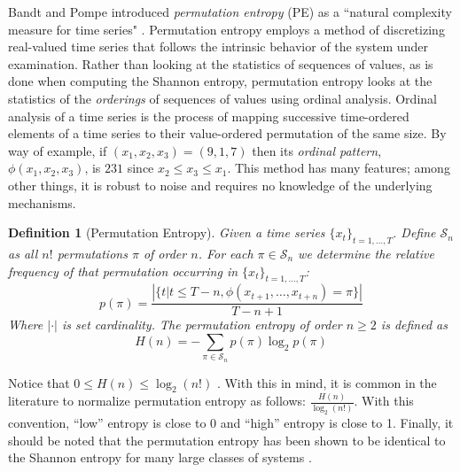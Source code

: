 \documentclass{article}
\newtheorem*{mydef}{Definition}
\begin{document}
Bandt and Pompe introduced \emph{permutation entropy} (PE)
as a ``natural complexity measure for time series"
\cite{bandt2002per}.  Permutation entropy employs a method of
discretizing real-valued time series that follows the intrinsic
behavior of the system under examination.  Rather than looking at the
statistics of sequences of values, as is done when computing the
Shannon entropy, permutation entropy looks at the statistics of the
\emph{orderings} of sequences of values using ordinal analysis.
Ordinal analysis of a time series is the process of mapping successive
time-ordered elements of a time series to their value-ordered
permutation of the same size.  By way of example, if $(x_1, x_2, x_3)
= (9, 1, 7)$ then its \emph{ordinal pattern}, $\phi(x_1, x_2, x_3)$,
is $231$ since $x_2 \leq x_3 \leq x_1$.  This method has many
features; among other things, it is robust to noise and requires no
knowledge of the underlying mechanisms.








\begin{mydef}[Permutation Entropy]
  Given a time series $\{x_t\}_{t = 1,\dots,T}$. Define
  $\mathcal{S}_n$ as all $n!$ permutations $\pi$ of order $n$. For
  each $\pi \in \mathcal{S}_n$ we determine the relative frequency of
  that permutation occurring in $\{x_t\}_{t = 1,\dots,T}$: $$ p(\pi) =
  \frac{\left|\{t|t\le T-n,\phi(x_{t+1},\dots,x_{t+n}) =
      \pi\}\right|}{T-n+1}$$ Where $|\cdot|$ is set cardinality. The
  \emph{permutation entropy} of order $n\ge 2$ is defined
  as$$H(n) = - \sum_{\pi \in
      \mathcal{S}_n} p(\pi)\log_2p(\pi)$$
\end{mydef}
Notice that $0\le H(n) \le \log_2(n!)$ \cite{bandt2002per}.  With this
in mind, it is common in the literature to normalize permutation
entropy as follows: $\frac{H(n)}{\log_2(n!)}$.  With this convention,
``low'' entropy is close to 0 and ``high'' entropy is close to 1.
Finally, it should be noted that the permutation entropy has been
shown to be identical to the Shannon entropy for many large classes of
systems \cite{amigo2012permutation}.
\end{document}
